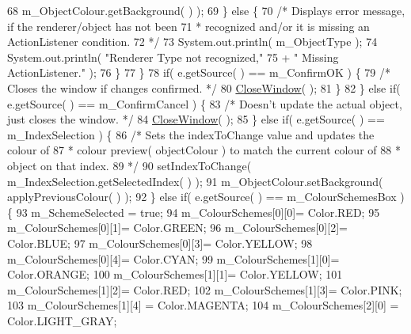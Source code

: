 \begin{DoxyCode}
68                               m\_ObjectColour.getBackground(  ) );
69                 \} \textcolor{keywordflow}{else} \{
70                     \textcolor{comment}{/* Displays error message, if the renderer/object has not been
}
71 \textcolor{comment}{                     * recognized and/or it is missing an ActionListener condition.
}
72 \textcolor{comment}{                     */}
73                     System.out.println( m\_ObjectType );
74                     System.out.println( \textcolor{stringliteral}{"Renderer Type not recognized,"}
75                                        + \textcolor{stringliteral}{" Missing ActionListener."} );
76                 \}
77             \}
78             \textcolor{keywordflow}{if}( e.getSource(  ) == m\_ConfirmOK ) \{
79                 \textcolor{comment}{/* Closes the window if changes confirmed. */}
80                 \hyperlink{class_colour_map_a397ebd08df86cb0bcbc71d3e4e1ebee4}{CloseWindow}(  );
81             \}
82         \} \textcolor{keywordflow}{else} \textcolor{keywordflow}{if}(  e.getSource(  ) == m\_ConfirmCancel ) \{
83             \textcolor{comment}{/* Doesn't update the actual object, just closes the window. */}
84             \hyperlink{class_colour_map_a397ebd08df86cb0bcbc71d3e4e1ebee4}{CloseWindow}(  );
85         \} \textcolor{keywordflow}{else} \textcolor{keywordflow}{if}(  e.getSource(  ) == m\_IndexSelection ) \{
86             \textcolor{comment}{/* Sets the indexToChange value and updates the colour of
}
87 \textcolor{comment}{             * colour preview(  objectColour ) to match the current colour of
}
88 \textcolor{comment}{             * object on that index.
}
89 \textcolor{comment}{             */}
90              setIndexToChange( m\_IndexSelection.getSelectedIndex(  ) );
91             m\_ObjectColour.setBackground( applyPreviousColour(  ) );
92         \} \textcolor{keywordflow}{else} \textcolor{keywordflow}{if}(  e.getSource(  ) == m\_ColourSchemesBox ) \{
93             m\_SchemeSelected = \textcolor{keyword}{true};
94             m\_ColourSchemes[0][0]= Color.RED;
95             m\_ColourSchemes[0][1]= Color.GREEN;
96             m\_ColourSchemes[0][2]= Color.BLUE;
97             m\_ColourSchemes[0][3]= Color.YELLOW;
98             m\_ColourSchemes[0][4]= Color.CYAN;
99             m\_ColourSchemes[1][0]= Color.ORANGE;
100             m\_ColourSchemes[1][1]= Color.YELLOW;
101             m\_ColourSchemes[1][2]= Color.RED;
102             m\_ColourSchemes[1][3]= Color.PINK;
103             m\_ColourSchemes[1][4] = Color.MAGENTA;
104             m\_ColourSchemes[2][0] = Color.LIGHT\_GRAY;

\end{DoxyCode}
